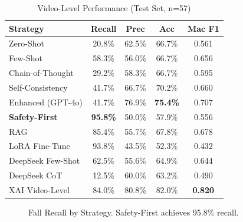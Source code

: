 \documentclass[conference]{IEEEtran}
\begin{document}
\begin{table}[H]
\centering
\caption{Video-Level Performance (Test Set, n=57)}
\label{tab:main_results}
\begin{tabular}{lcccc}
\toprule
\textbf{Strategy} & \textbf{Recall} & \textbf{Prec} & \textbf{Acc} & \textbf{Mac F1} \\
\midrule
Zero-Shot & 20.8\% & 62.5\% & 66.7\% & 0.561 \\
Few-Shot & 58.3\% & 56.0\% & 66.7\% & 0.656 \\
Chain-of-Thought & 29.2\% & 58.3\% & 66.7\% & 0.595 \\
Self-Consistency & 41.7\% & 66.7\% & 70.2\% & 0.660 \\
Enhanced (GPT-4o) & 41.7\% & 76.9\% & \textbf{75.4\%} & 0.707 \\
\textbf{Safety-First} & \textbf{95.8\%} & 50.0\% & 57.9\% & 0.556 \\
RAG & 85.4\% & 55.7\% & 67.8\% & 0.678 \\
LoRA Fine-Tune & 93.8\% & 43.5\% & 52.3\% & 0.432 \\
DeepSeek Few-Shot & 62.5\% & 55.6\% & 64.9\% & 0.644 \\
DeepSeek CoT & 12.5\% & 60.0\% & 63.2\% & 0.490 \\
XAI Video-Level & 84.0\% & 80.8\% & 82.0\% & \textbf{0.820} \\
\bottomrule
\end{tabular}
\end{table}

\begin{figure}[H]
\centering
{}
\caption{Fall Recall by Strategy. Safety-First achieves 95.8\% recall.}
\label{fig:recall_comparison}
\end{figure}
\end{document}
